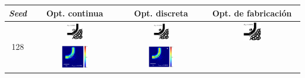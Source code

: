 \begin{table}[H]
    \centering
    \vspace*{-2.5cm}
    \hspace*{-3cm}
    \begin{tabular}{|c|c|c|c|}
    \hline 
    \emph{Seed} & Opt. continua & Opt. discreta &  Opt. de fabricación \\
    \hline
      \multirow{2}{*}{128} &
      \includegraphics[width=0.20\textwidth]{image/results/bend/L-BFGS-B/visualize_eps_cont_128.png} &
      \includegraphics[width=0.20\textwidth]{image/results/bend/L-BFGS-B/visualize_eps_disc_128.png} &
      \includegraphics[width=0.20\textwidth]{image/results/bend/L-BFGS-B/visualize_eps_fab_128.png} \\
      \cline{2-4}
      &
      \includegraphics[width=0.33\textwidth]{image/results/bend/L-BFGS-B/visualize_field_cont_128.png} &
      \includegraphics[width=0.33\textwidth]{image/results/bend/L-BFGS-B/visualize_field_disc_128.png} &

\end{tabular}
\end{table}
